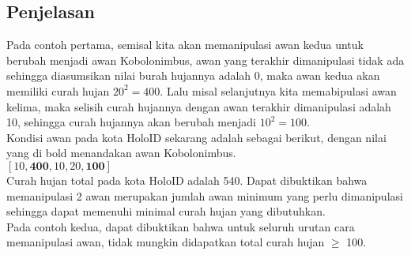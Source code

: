 \documentclass{article}
\begin{document}
\subsection*{Penjelasan}
Pada contoh pertama, semisal kita akan memanipulasi awan kedua untuk berubah menjadi awan Kobolonimbus, awan yang terakhir dimanipulasi tidak ada sehingga diasumsikan nilai burah hujannya adalah 0, maka awan kedua akan memiliki curah hujan $20^2 = 400$. Lalu misal selanjutnya kita memabipulasi awan kelima, maka selisih curah hujannya dengan awan terakhir dimanipulasi adalah 10, sehingga curah hujannya akan berubah menjadi $10^2 = 100$. \\
Kondisi awan pada kota HoloID sekarang adalah sebagai berikut, dengan nilai yang di bold menandakan awan Kobolonimbus.\\
$[10, \textbf{400}, 10, 20, \textbf{100}]$\\
Curah hujan total pada kota HoloID adalah 540. Dapat dibuktikan bahwa memanipulasi 2 awan merupakan jumlah awan minimum yang perlu dimanipulasi sehingga dapat memenuhi minimal curah hujan yang dibutuhkan.\\

Pada contoh kedua, dapat dibuktikan bahwa untuk seluruh urutan cara memanipulasi awan, tidak mungkin didapatkan total curah hujan $\geq$ 100.
\end{document}
